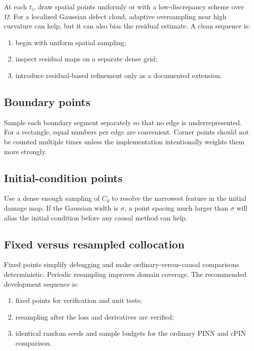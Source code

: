\documentclass[11pt]{article}
\newcommand{\Om}{\Omega}
\begin{document}
At each $t_i$, draw spatial points uniformly or with a low-discrepancy scheme over $\Om$. For a localized Gaussian defect cloud, adaptive oversampling near high curvature can help, but it can also bias the residual estimate. A clean sequence is:
\begin{enumerate}[label=\arabic*.]
    \item begin with uniform spatial sampling;
    \item inspect residual maps on a separate dense grid;
    \item introduce residual-based refinement only as a documented extension.
\end{enumerate}

\subsection{Boundary points}

Sample each boundary segment separately so that no edge is underrepresented. For a rectangle, equal numbers per edge are convenient. Corner points should not be counted multiple times unless the implementation intentionally weights them more strongly.

\subsection{Initial-condition points}

Use a dense enough sampling of $C_0$ to resolve the narrowest feature in the initial damage map. If the Gaussian width is $\sigma$, a point spacing much larger than $\sigma$ will alias the initial condition before any causal method can help.

\subsection{Fixed versus resampled collocation}

Fixed points simplify debugging and make ordinary-versus-causal comparisons deterministic. Periodic resampling improves domain coverage. The recommended development sequence is:
\begin{enumerate}[label=\arabic*.]
    \item fixed points for verification and unit tests;
    \item resampling after the loss and derivatives are verified;
    \item identical random seeds and sample budgets for the ordinary PINN and cPIN comparison.
\end{enumerate}
\end{document}
